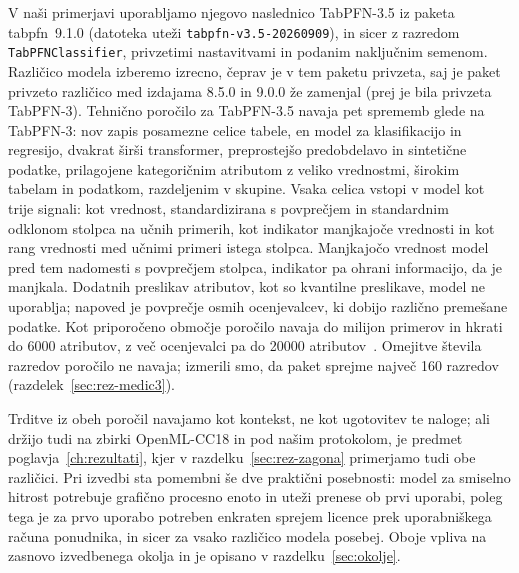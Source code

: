 \documentclass[a4paper,12pt,openright]{book}
\begin{document}
V naši primerjavi uporabljamo njegovo naslednico TabPFN-3.5 iz paketa
tabpfn~9.1.0 (datoteka uteži \texttt{tabpfn-v3.5-20260909}), in sicer z
razredom \texttt{TabPFNClassifier}, privzetimi nastavitvami in podanim
naključnim semenom. Različico modela izberemo izrecno, čeprav je v tem paketu
privzeta, saj je paket privzeto različico med izdajama 8.5.0 in 9.0.0 že
zamenjal (prej je bila privzeta TabPFN-3). Tehnično poročilo za TabPFN-3.5
navaja pet sprememb glede na TabPFN-3: nov zapis posamezne celice tabele, en
model za klasifikacijo in regresijo, dvakrat širši transformer, preprostejšo
predobdelavo in sintetične podatke, prilagojene kategoričnim atributom z veliko
vrednostmi, širokim tabelam in podatkom, razdeljenim v skupine. Vsaka celica
vstopi v model kot trije signali: kot vrednost, standardizirana s povprečjem in
standardnim odklonom stolpca na učnih primerih, kot indikator manjkajoče
vrednosti in kot rang vrednosti med učnimi primeri istega stolpca. Manjkajočo
vrednost model pred tem nadomesti s povprečjem stolpca, indikator pa ohrani
informacijo, da je manjkala. Dodatnih preslikav atributov, kot so kvantilne
preslikave, model ne uporablja; napoved je povprečje osmih ocenjevalcev, ki
dobijo različno premešane podatke. Kot priporočeno območje poročilo navaja do
milijon primerov in hkrati do 6000 atributov, z več ocenjevalci pa do
\num{20000} atributov~\cite{jager2026tabpfn35}. Omejitve števila razredov
poročilo ne navaja; izmerili smo, da paket sprejme največ 160 razredov
(razdelek~\ref{sec:rez-medic3}).

Trditve iz obeh poročil navajamo kot kontekst, ne kot ugotovitev te naloge;
ali držijo tudi na zbirki OpenML-CC18 in pod našim protokolom, je predmet
poglavja~\ref{ch:rezultati}, kjer v razdelku~\ref{sec:rez-zagona} primerjamo
tudi obe različici. Pri izvedbi sta pomembni še dve praktični posebnosti: model
za smiselno hitrost potrebuje grafično procesno enoto in uteži prenese ob prvi
uporabi, poleg tega je za prvo uporabo potreben enkraten sprejem licence prek
uporabniškega računa ponudnika, in sicer za vsako različico modela posebej.
Oboje vpliva na zasnovo izvedbenega okolja in je opisano v
razdelku~\ref{sec:okolje}.
\end{document}
